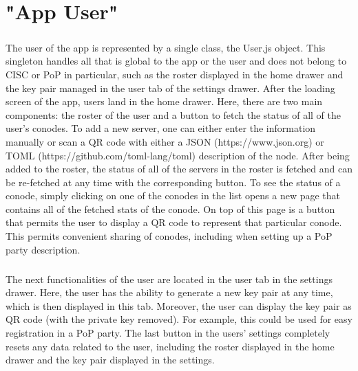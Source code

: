 \chapter{"App User"}

\paragraph{}
The user of the app is represented by a single class, the User.js object. This singleton handles all that is global to the app or the user and does not belong to CISC or PoP in particular, such as the roster displayed in the home drawer and the key pair managed in the user tab of the settings drawer. After the loading screen of the app, users land in the home drawer. Here, there are two main components: the roster of the user and a button to fetch the status of all of the user’s conodes. To add a new server, one can either enter the information manually or scan a QR code with either a JSON (https://www.json.org) or TOML (https://github.com/toml-lang/toml) description of the node. After being added to the roster, the status of all of the servers in the roster is fetched and can be re-fetched at any time with the corresponding button. To see the status of a conode, simply clicking on one of the conodes in the list opens a new page that contains all of the fetched stats of the conode. On top of this page is a button that permits the user to display a QR code to represent that particular conode. This permits convenient sharing of conodes, including when setting up a PoP party description.

\paragraph{}
The next functionalities of the user are located in the user tab in the settings drawer. Here, the user has the ability to generate a new key pair at any time, which is then displayed in this tab. Moreover, the user can display the key pair as QR code (with the private key removed). For example, this could be used for easy registration in a PoP party. The last button in the users’ settings completely resets any data related to the user, including the roster displayed in the home drawer and the key pair displayed in the settings.
